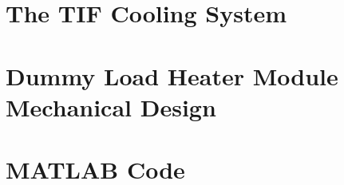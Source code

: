 \documentclass{report}
\begin{document}
\chapter{The TIF Cooling System}\label{app:TIF}


%
%

\chapter{Dummy Load Heater Module Mechanical Design} \label{app:DummyLoad}



\chapter{MATLAB Code} \label{app:Matlab}
\end{document}
